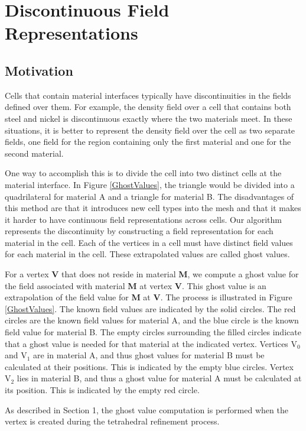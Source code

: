 \documentclass{siggraph}
\begin{document}
\section {Discontinuous Field Representations}
\subsection{Motivation}
Cells that contain material interfaces typically have discontinuities
in the fields defined over them.  For example, the density field over a
cell that contains both steel and nickel is discontinuous exactly
where the two materials meet.  In these situations, it is better to
represent the density field over the cell as two separate fields, one
field for the region containing only the first material and one for
the second material.


One way to accomplish this is to divide the cell into two distinct
cells at the material interface.  In Figure \ref{GhostValues}, the
triangle would be divided into a quadrilateral for material A and a
triangle for material B.  The disadvantages of this method are that it
introduces new cell types into the mesh and that it makes it harder to
have continuous field representations across cells.  Our algorithm
represents the discontinuity by constructing a field representation
for each material in the cell.  Each of the vertices in a cell must
have distinct field values for each material in the cell.  These
extrapolated values are called ghost values.


For a vertex {\bf{V}} that does not reside in material {\bf{M}}, we
compute a ghost value for the field associated with material {\bf{M}}
at vertex {\bf{V}}.  This ghost value is an extrapolation of the field
value for {\bf{M}} at {\bf{V}}.  The process is illustrated in Figure
\ref{GhostValues}.  The known field values are indicated by the solid
circles.  The red circles are the known field values for material A,
and the blue circle is the known field value for material B.  The empty
circles surrounding the filled circles indicate that a ghost value is
needed for that material at the indicated vertex.  Vertices V$_{0}$
and V$_{1}$ are in material A, and thus ghost values for material B
must be calculated at their positions.  This is indicated by the empty
blue circles.  Vertex V$_{2}$ lies in material B, and thus a ghost
value for material A must be calculated at its position.  This is
indicated by the empty red circle.


As described in Section 1, the ghost value computation is performed 
when the vertex is created during the tetrahedral refinement process.
\end{document}
